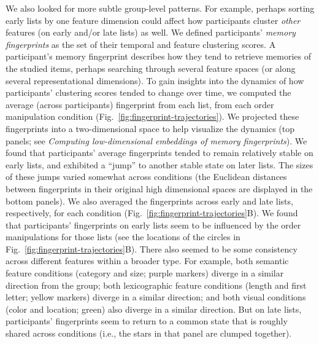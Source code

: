 \documentclass[11pt]{article}
\begin{document}
We also looked for more subtle group-level patterns. For example, perhaps
sorting early lists by one feature dimension could affect how participants
cluster \textit{other} features (on early and/or late lists) as well. We
defined participants' \textit{memory fingerprints} as the set of their temporal
and feature clustering scores. A participant's memory fingerprint describes how
they tend to retrieve memories of the studied items, perhaps searching through
several feature spaces (or along several representational dimensions). To gain
insights into the dynamics of how participants' clustering scores tended to
change over time, we computed the average (across participants) fingerprint
from each list, from each order manipulation condition
(Fig.~\ref{fig:fingerprint-trajectories}). We projected these fingerprints into
a two-dimensional space to help visualize the dynamics (top panels; see
\textit{Computing low-dimensional embeddings of memory fingerprints}). We found
that participants' average fingerprints tended to remain relatively stable on
early lists, and exhibited a ``jump'' to another stable state on later lists.
The sizes of these jumps varied somewhat across conditions (the Euclidean
distances between fingerprints in their original high dimensional spaces are
displayed in the bottom panels). We also averaged the fingerprints across early
and late lists, respectively, for each condition
(Fig.~\ref{fig:fingerprint-trajectories}B). We found that participants'
fingerprints on early lists seem to be influenced by the order manipulations
for those lists (see the locations of the circles in
Fig.~\ref{fig:fingerprint-trajectories}B). There also seemed to be some
consistency across different features within a broader type. For example, both
semantic feature conditions (category and size; purple markers) diverge in a
similar direction from the group; both lexicographic feature conditions (length
and first letter; yellow markers) diverge in a similar direction; and both
visual conditions (color and location; green) also diverge in a similar
direction. But on late lists, participants' fingerprints seem to return to a
common state that is roughly shared across conditions (i.e., the stars in that
panel are clumped together).
\end{document}
